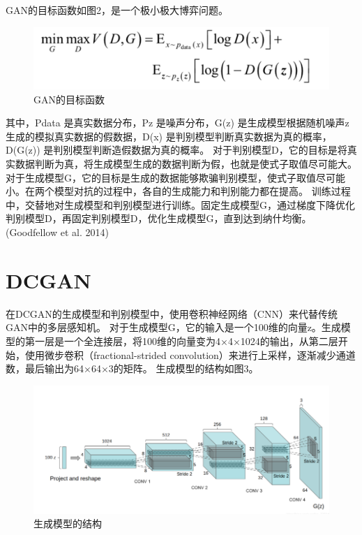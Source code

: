 \documentclass[
  hyperref, a4paper]{ctexart}
\begin{document}
GAN的目标函数如图2，是一个极小极大博弈问题。

\begin{figure}
\centering
\includegraphics{2.png}
\caption{GAN的目标函数}
\end{figure}

其中，Pdata 是真实数据分布，Pz 是噪声分布，G(z) 是生成模型根据随机噪声z
生成的模拟真实数据的假数据，D(x)
是判别模型判断真实数据为真的概率，D(G(z))
是判别模型判断造假数据为真的概率。
对于判别模型D，它的目标是将真实数据判断为真，将生成模型生成的数据判断为假，也就是使式子取值尽可能大。对于生成模型G，它的目标是生成的数据能够欺骗判别模型，使式子取值尽可能小。在两个模型对抗的过程中，各自的生成能力和判别能力都在提高。
训练过程中，交替地对生成模型和判别模型进行训练。固定生成模型G，通过梯度下降优化判别模型D，再固定判别模型D，优化生成模型G，直到达到纳什均衡。(Goodfellow
et al. 2014)

\hypertarget{dcgan}{%
\section{DCGAN}\label{dcgan}}

在DCGAN的生成模型和判别模型中，使用卷积神经网络（CNN）来代替传统GAN中的多层感知机。
对于生成模型G，它的输入是一个100维的向量z。生成模型的第一层是一个全连接层，将100维的向量变为4×4×1024的输出，从第二层开始，使用微步卷积（fractional-strided
convolution）来进行上采样，逐渐减少通道数，最后输出为64×64×3的矩阵。
生成模型的结构如图3。

\begin{figure}
\centering
\includegraphics{3.png}
\caption{生成模型的结构}
\end{figure}
\end{document}
